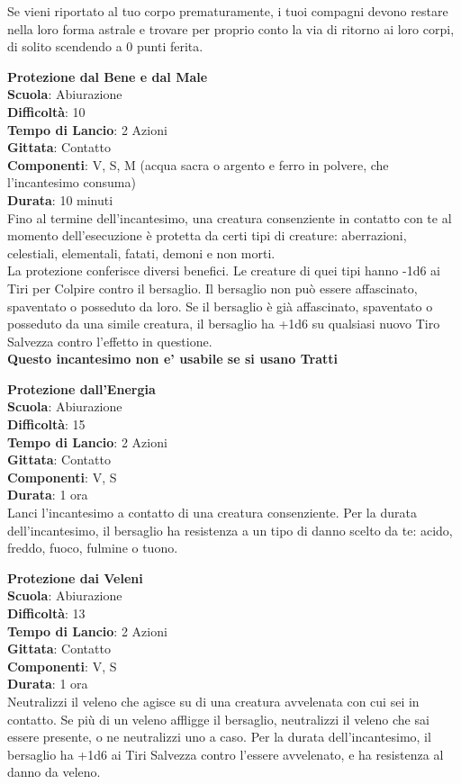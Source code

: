 \begin{multicols}{2}
Se vieni riportato al tuo corpo prematuramente, i tuoi compagni devono restare nella loro forma astrale e trovare per proprio conto la via di ritorno ai loro corpi, di solito scendendo a 0 punti ferita.

\medskip\textbf{Protezione dal Bene e dal Male}\\
\textbf{Scuola}: Abiurazione\\
\textbf{Difficoltà}:  10\\
\textbf{Tempo di Lancio}: 2 Azioni\\
\textbf{Gittata}: Contatto\\
\textbf{Componenti}: V, S, M (acqua sacra o argento e ferro in polvere, che l'incantesimo consuma)\\
\textbf{Durata}: 10 minuti\\
Fino al termine dell'incantesimo, una creatura consenziente in contatto con te al momento dell'esecuzione è protetta da certi tipi di creature: aberrazioni, celestiali, elementali, fatati, demoni e non morti.\\
La protezione conferisce diversi benefici. Le creature di quei tipi hanno -1d6 ai Tiri per Colpire contro il bersaglio. Il bersaglio non può essere affascinato, spaventato o posseduto da loro. Se il bersaglio è già affascinato, spaventato o posseduto da una simile creatura, il bersaglio ha +1d6 su qualsiasi nuovo Tiro Salvezza contro l’effetto in questione.\\
\textbf{Questo incantesimo non e' usabile se si usano  Tratti}

\medskip\textbf{Protezione dall'Energia}\\
\textbf{Scuola}: Abiurazione\\
\textbf{Difficoltà}:  15\\
\textbf{Tempo di Lancio}: 2 Azioni\\
\textbf{Gittata}: Contatto\\
\textbf{Componenti}: V, S\\
\textbf{Durata}: 1 ora\\
Lanci l'incantesimo a contatto di una creatura consenziente. Per la durata dell'incantesimo, il bersaglio ha resistenza a un tipo di danno scelto da te: acido, freddo, fuoco, fulmine o tuono.

\medskip\textbf{Protezione dai Veleni}\\
\textbf{Scuola}: Abiurazione\\
\textbf{Difficoltà}:  13\\
\textbf{Tempo di Lancio}: 2 Azioni\\
\textbf{Gittata}: Contatto\\
\textbf{Componenti}: V, S\\
\textbf{Durata}: 1 ora\\
Neutralizzi il veleno che agisce su di una creatura avvelenata con cui sei in contatto. Se più di un veleno affligge il bersaglio, neutralizzi il veleno che sai essere presente, o ne neutralizzi uno a caso. Per la durata dell'incantesimo, il bersaglio ha +1d6 ai Tiri Salvezza contro l’essere avvelenato, e ha resistenza al danno da veleno.


\end{multicols}
